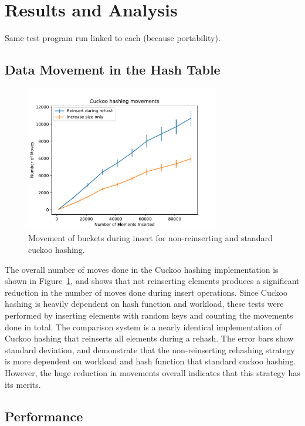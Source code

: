 \section{Results and Analysis}

Same test program run linked to each (because portability).

\subsection{Data Movement in the Hash Table}

\begin{figure}
\centering
\hspace*{-0.3in}
\includegraphics[width=85mm]{fig/moves}
\caption{Movement of buckets during insert for non-reinserting and standard
cuckoo hashing.}
\label{fig:moves}
\end{figure}

The overall number of moves done in the Cuckoo hashing implementation is shown
in Figure~\ref{fig:moves}, and shows that not reinserting elements produces a
significant reduction in the number of moves done during insert operations.
Since Cuckoo hashing is heavily dependent on hash function and workload, these
tests were performed by inserting elements with random keys and counting the
movements done in total. The comparison system is a nearly identical
implementation of Cuckoo hashing that reinserts all elements during a rehash.
The error bars show standard deviation, and demonstrate that the non-reinserting
rehashing strategy is more dependent on workload and hash function that standard
cuckoo hashing. However, the huge reduction in movements overall indicates that
this strategy has its merits.

\subsection{Performance}

